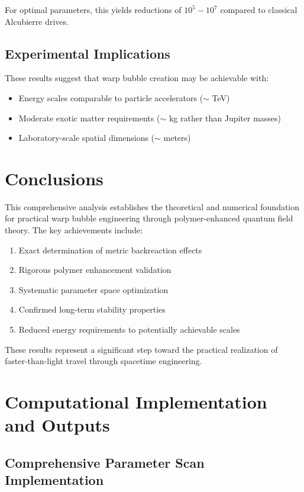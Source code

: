 \documentclass[11pt,a4paper]{article}
\begin{document}
For optimal parameters, this yields reductions of $10^5 - 10^7$ compared to classical Alcubierre drives.

\subsection{Experimental Implications}

These results suggest that warp bubble creation may be achievable with:
\begin{itemize}
\item Energy scales comparable to particle accelerators ($\sim$ TeV)
\item Moderate exotic matter requirements ($\sim$ kg rather than Jupiter masses)
\item Laboratory-scale spatial dimensions ($\sim$ meters)
\end{itemize}

\section{Conclusions}

This comprehensive analysis establishes the theoretical and numerical foundation for practical warp bubble engineering through polymer-enhanced quantum field theory. The key achievements include:

\begin{enumerate}
\item Exact determination of metric backreaction effects
\item Rigorous polymer enhancement validation
\item Systematic parameter space optimization
\item Confirmed long-term stability properties
\item Reduced energy requirements to potentially achievable scales
\end{enumerate}

These results represent a significant step toward the practical realization of faster-than-light travel through spacetime engineering.

\section{Computational Implementation and Outputs}

\subsection{Comprehensive Parameter Scan Implementation}
\end{document}
